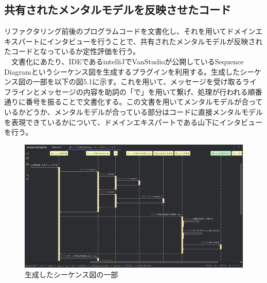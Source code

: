 \documentclass[12pt, a4paper]{jreport}
\begin{document}
\subsection{共有されたメンタルモデルを反映させたコード}
リファクタリング前後のプログラムコードを文書化し、それを用いてドメインエキスパートにインタビューを行うことで、共有されたメンタルモデルが反映されたコードとなっているか定性評価を行う。
\\　文書化にあたり、IDEであるintelliJでVanStudioが公開しているSequence Diagramというシーケンス図を生成するプラグインを利用する。生成したシーケンス図の一部を以下の図5.1に示す。これを用いて、メッセージを受け取るライフラインとメッセージの内容を助詞の「で」を用いて繋げ、処理が行われる順番通りに番号を振ることで文書化する。この文書を用いてメンタルモデルが合っているかどうか、メンタルモデルが合っている部分はコードに直接メンタルモデルを表現できているかについて、ドメインエキスパートである山下にインタビューを行う。
\begin{figure}[H]
\centering
\includegraphics[width=1\linewidth]{image/sequence.png}
\caption{生成したシーケンス図の一部}
\label{fig:enter-label}
\end{figure}
\end{document}
